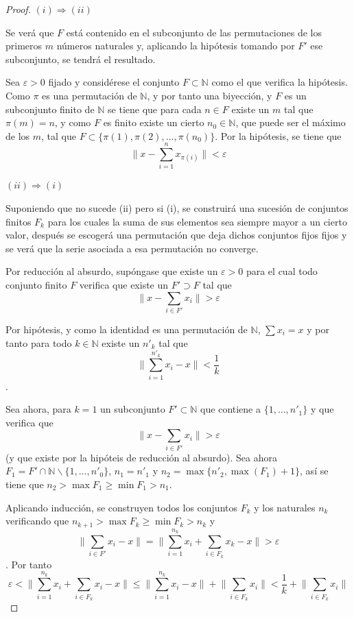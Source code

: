 		\begin{proof}
			\noindent $(i) \Longrightarrow (ii)$
			
			Se verá que $F$ está contenido en el subconjunto de las permutaciones de los primeros $m$ números naturales y, aplicando la hipótesis tomando por $F'$ ese subconjunto, se tendrá el resultado.
			
			Sea $\varepsilon >0$ fijado y considérese el conjunto $F \subset \mathbb{N}$ como el que verifica la hipótesis. Como $\pi$ es una permutación de $\mathbb{N}$, y por tanto una biyección, y $F$ es un subconjunto finito de $\mathbb{N}$ se tiene que para cada $n \in F$ existe un $m$ tal que $\pi(m) = n$, y como $F$ es finito existe un cierto $n_0 \in \mathbb{N}$, que puede ser el máximo de los $m$, tal que $F \subset \{ \pi(1), \pi(2),\ldots, \pi(n_0) \}$. Por la hipótesis, se tiene que 
			$$\big\| x -  \sum_{i=1}^{n}{x_{\pi(i)}} \big\| < \varepsilon$$
			
			\noindent $(ii) \Longrightarrow (i)$
			
			Suponiendo que no sucede (ii) pero si (i), se construirá una sucesión de conjuntos finitos $F_k$ para los cuales la suma de sus elementos sea siempre mayor a un cierto valor, después se escogerá una permutación que deja dichos conjuntos fijos fijos y se verá que la serie asociada a esa permutación no converge.
			
			Por reducción al absurdo, supóngase  que existe un $\varepsilon > 0$ para el cual todo conjunto finito $F$ verifica que existe un $F' \supset F$ tal que  
			$$\big\| x -  \sum_{i \in F'}{x_i} \big\| > \varepsilon$$ 
			
			Por hipótesis, y como la identidad es una permutación de $\mathbb{N}$, $\sum{x_i} = x$ y por tanto para todo $k \in \mathbb{N}$ existe un $n'_k$ tal que 
			$$\big\| \displaystyle \sum_{i=1}^{n'_k}{x_i} - x \big\| < \frac{1}{k}$$.
			
			Sea ahora, para $k = 1$ un subconjunto $F' \subset \mathbb{N}$   que contiene a $\{1,\ldots, n'_1\}$ y que verifica que 
			$$\big\| x - \displaystyle \sum_{i \in F'}{x_i} \big\| > \varepsilon$$
			(y que existe por la hipóteis de reducción al absurdo). Sea ahora $F_1 = F' \cap \mathbb{N} \backslash \{1, \ldots, n'_0\}$, $n_1 = n'_1$ y $n_2 = \max\{n'_2, \max(F_1) +1\}$, así se tiene que  $n_{2} >  \max{F_1} \geq \min{F_1} > n_1$.
			
			Aplicando inducción, se construyen todos los conjuntos $F_k$ y los naturales $n_k$ verificando que $n_{k+1} > \max F_k \geq \min F_k > n_k$ y 
			$$\big\| \sum_{i \in F'}{x_i} - x \big\| = \big\|  \sum_{i=1}^{n_k}{x_i} +  \sum_{i \in F_k}{x_k} - x\big\| > \varepsilon$$.
			Por tanto 
			$$\varepsilon < \big\|\sum_{i=1}^{n_k}{x_i} + \sum_{i \in F_k}{x_i} - x \big\| \leq \big\|  \sum_{i=1}^{n_k}{x_i}  - x\big\| + \big\| \sum_{i \in F_k}{x_i} \big\| < \frac{1}{k} + \big\|  \sum_{i\in F_k}{x_i} \big\|$$
			

\end{proof}
